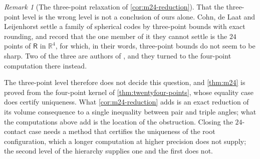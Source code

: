 \documentclass[11pt,reqno]{amsart}
\renewcommand{\_}{\origunderscore\allowbreak}
\numberwithin{equation}{section}
\theoremstyle{plain}
\theoremstyle{definition}
\theoremstyle{remark}
\newtheorem{remark}[thm]{Remark}
\newcommand{\Rt}{\mathsf{R}}                 %
\begin{document}
\begin{remark}[The three-point relaxation of \cref{cor:m24-reduction}]
That the three-point level is the wrong level is not a conclusion of
ours alone. Cohn, de Laat and Leijenhorst \cite{CdLL24} settle a family
of spherical codes by three-point bounds with exact rounding, and record
that the one member of it they cannot settle is the $24$ points of
$\Rt$ in $\mathbb{R}^4$, for which, in their words, three-point bounds
do not seem to be sharp. Two of the three are authors of \cite{LLM24},
and they turned to the four-point computation there instead.

The three-point level therefore does not decide this question, and
\cref{thm:m24} is proved from the four-point kernel of
\cref{thm:twentyfour-points}, whose equality case does certify
uniqueness. What \cref{cor:m24-reduction} adds is an
exact reduction of its volume consequence to a single inequality
between pair and triple angles; what the computations above add is the
location of the obstruction. Closing the $24$-contact case needs a
method that certifies the uniqueness of the root configuration, which a
longer computation at higher precision does not supply; the second level
of the hierarchy supplies one and the first does not.
\end{remark}
\end{document}
